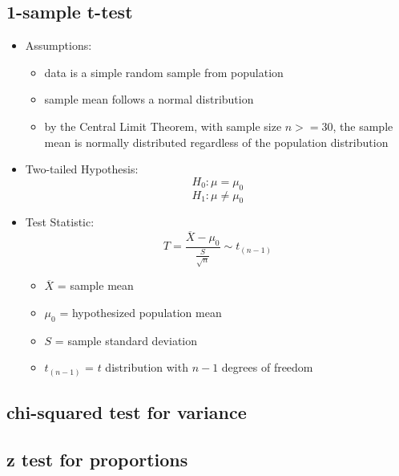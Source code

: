 \documentclass[]{book}
\providecommand{\tightlist}{%
  \setlength{\itemsep}{0pt}\setlength{\parskip}{0pt}}
\begin{document}
\hypertarget{sample-t-test}{%
\subsection{1-sample t-test}\label{sample-t-test}}

\begin{itemize}
\item
  Assumptions:

  \begin{itemize}
  \tightlist
  \item
    data is a simple random sample from population
  \item
    sample mean follows a normal distribution
  \item
    by the Central Limit Theorem, with sample size \(n>=30\), the sample mean is normally distributed regardless of the population distribution
  \end{itemize}
\item
  Two-tailed Hypothesis:
  \[ H_0: \mu = \mu_0 \]
  \[ H_1: \mu \neq \mu_0 \]
\item
  Test Statistic:
  \[ T = \frac{\overline{X}-\mu_0}{\frac{S}{\sqrt{n}}} \sim t_{(n-1)} \]

  \begin{itemize}
  \tightlist
  \item
    \(\overline{X}\) = sample mean
  \item
    \(\mu_0\) = hypothesized population mean
  \item
    \(S\) = sample standard deviation
  \item
    \(t_{(n-1)}\) = \(t\) distribution with \(n-1\) degrees of freedom
  \end{itemize}
\end{itemize}

\hypertarget{chi-squared-test-for-variance}{%
\subsection{chi-squared test for variance}\label{chi-squared-test-for-variance}}

\hypertarget{z-test-for-proportions}{%
\subsection{z test for proportions}\label{z-test-for-proportions}}
\end{document}
